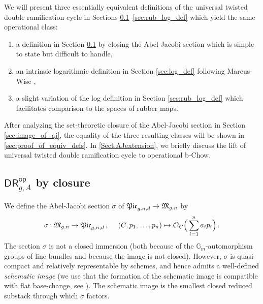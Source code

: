 \documentclass[a4paper,12pt]{article} %
\newcommand{\bb}[1]{{\mathbb{#1}}}
\newcommand{\ca}[1]{{\mathcal{#1}}}
\theoremstyle{definition}
\theoremstyle{plain}%
\newcommand{\Picabs}{\mathfrak{Pic}}
\begin{document}
We will present three essentially equivalent definitions of the universal
twisted double ramification cycle
in Sections \ref{sec:naive_def}--\ref{sec:rub_log_def} which yield the same operational class: 
\begin{enumerate}
\item[$\bullet$] a definition in Section \ref{sec:naive_def} by closing
the Abel-Jacobi section
which is simple to state but difficult to
handle,
\item[$\bullet$] an intrinsic logarithmic definition in Section
\ref{sec:log_def}
following Marcus-Wise \cite{Marcus2017Logarithmic-com},
 
\item[$\bullet$] a slight variation of the log definition in
Section \ref{sec:rub_log_def}
which facilitates  comparison to the spaces of rubber maps.
\end{enumerate}
After analyzing the set-theoretic closure of the Abel-Jacobi section in
Section \ref{sec:image_of_aj},
the equality of the three resulting classes will be shown in \cref{sec:proof_of_equiv_defs}. 
In \cref{Sect:AJextension}, we briefly discuss 
the lift of universal twisted
 double ramification cycle to operational b-Chow.

\subsection{$\mathsf{DR}^{\mathsf{op}}_{g,A}$ by closure}
\label{sec:naive_def}

We define the Abel-Jacobi section $\sigma$ of $\Picabs_{g,n,d} \to \frak M_{g,n}$  by
\begin{equation}
\sigma\colon \frak M_{g,n} \to \Picabs_{g,n,d}\, ,\ \ \ \ (C, p_1, \dots, p_n) \mapsto \ca O_C\Big(\sum_{i=1}^n a_i p_i\Big)\, . 
\end{equation}
The section $\sigma$  is not a closed immersion (both because 
of the $\bb G_m$-automorphism groups of line bundles and because the
image is not closed).
However, $\sigma$ is quasi-compact and relatively representable by schemes, and hence admits a well-defined \emph{schematic image} (we use that the formation of the schematic image is compatible with flat base-change, see \cite[\href{https://stacks.math.columbia.edu/tag/081I}{Tag 081I}]{stacks-project}). 
The schematic image is the smallest closed reduced substack through which
$\sigma$ factors.
\end{document}
